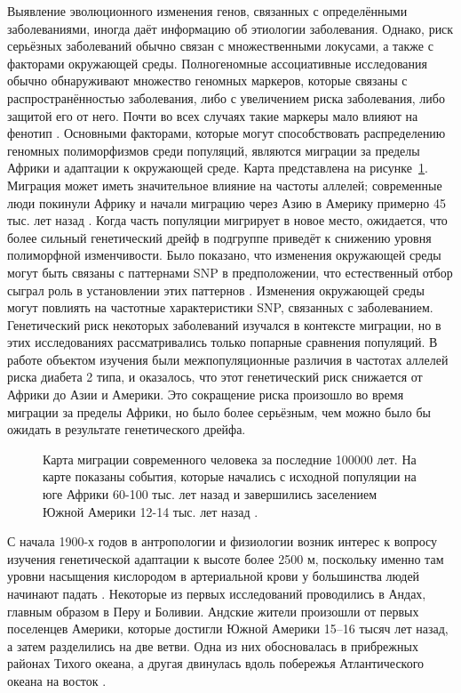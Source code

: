 Выявление эволюционного изменения генов, связанных с определёнными заболеваниями, иногда даёт информацию об этиологии заболевания. Однако, риск серьёзных заболеваний обычно связан с множественными локусами, а также с факторами окружающей среды. Полногеномные ассоциативные исследования обычно обнаруживают множество геномных маркеров, которые связаны с распространённостью заболевания, либо с увеличением риска заболевания, либо защитой его от него. Почти во всех случаях такие маркеры мало влияют на фенотип \autocite{Blair2015}. Основными факторами, которые могут способствовать распределению геномных полиморфизмов среди популяций, являются миграции за пределы Африки и адаптации к окружающей среде. Карта представлена на рисунке~\cref{fig:map}. Миграция может иметь значительное влияние на частоты аллелей; современные люди покинули Африку и начали миграцию через Азию в Америку примерно 45 тыс. лет назад \autocite{Henn2011, Henn2012}. Когда часть популяции мигрирует в новое место, ожидается, что более сильный генетический дрейф в подгруппе приведёт к снижению уровня полиморфной изменчивости. Было показано, что изменения окружающей среды могут быть связаны с паттернами SNP в предположении, что естественный отбор сыграл роль в установлении этих паттернов \autocite{Hancock2011adaptations}. Изменения окружающей среды могут повлиять на частотные характеристики SNP, связанных с заболеванием. Генетический риск некоторых заболеваний изучался в контексте миграции, но в этих исследованиях рассматривались только попарные сравнения популяций. В работе \autocite{Chen2012} объектом изучения были межпопуляционные различия в частотах аллелей риска диабета 2 типа, и оказалось, что этот генетический риск снижается от Африки до Азии и Америки. Это сокращение риска произошло во время миграции за пределы Африки, но было более серьёзным, чем можно было бы ожидать в результате генетического дрейфа. 

\begin{figure}[ht]
	\caption[Карта миграции современного человека за последние 100000 лет.]{Карта миграции современного человека за последние 100000 лет. На карте показаны события, которые начались с исходной популяции на юге Африки 60-100 тыс. лет назад и завершились заселением Южной Америки 12-14 тыс. лет назад \autocite{Henn2012}.}\label{fig:map}
\end{figure}

С начала 1900-х годов в антропологии и физиологии возник интерес к вопросу изучения генетической адаптации к высоте более 2500 м, поскольку именно там уровни насыщения кислородом в артериальной крови у большинства людей начинают падать \autocite{Julian2019}. Некоторые из первых исследований проводились в Андах, главным образом в Перу и Боливии. Андские жители произошли от первых поселенцев Америки, которые достигли Южной Америки 15--16 тысяч лет назад, а затем разделились на две ветви. Одна из них обосновалась в прибрежных районах Тихого океана, а другая двинулась вдоль побережья Атлантического океана на восток \autocite{GomezCarballa2018}. 

